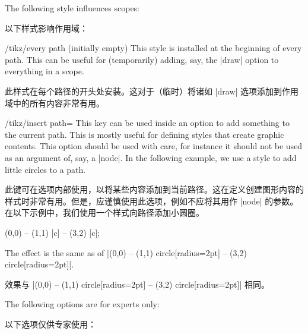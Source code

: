 The following style influences scopes:


以下样式影响作用域：

%
\begin{stylekey}{/tikz/every path (initially \normalfont empty)}
    This style is installed at the beginning of every path. This can be
    useful for (temporarily) adding, say, the |draw| option to everything
    in a scope.
    
    此样式在每个路径的开头处安装。这对于（临时）将诸如 |draw| 选项添加到作用域中的所有内容非常有用。%
\begin{codeexample}[]
\end{codeexample}
\end{stylekey}

\begin{key}{/tikz/insert path=}
    This key can be used inside an option to add something to the current path.
    This is mostly useful for defining styles that create graphic contents.
    This option should be used with care, for instance it should not be used as
    an argument of, say, a |node|. In the following example, we use a style to
    add little circles to a path.

    此键可在选项内部使用，以将某些内容添加到当前路径。这在定义创建图形内容的样式时非常有用。但是，应谨慎使用此选项，例如不应将其用作 |node| 的参数。在以下示例中，我们使用一个样式向路径添加小圆圈。
\begin{codeexample}[]
\tikz [c/.style={insert path={circle[radius=2pt]}}]
  \draw (0,0) -- (1,1) [c] -- (3,2) [c];
\end{codeexample}
     The effect is the same as of
    |(0,0) -- (1,1) circle[radius=2pt] -- (3,2) circle[radius=2pt]|.

    效果与 |(0,0) -- (1,1) circle[radius=2pt] -- (3,2) circle[radius=2pt]| 相同。
\end{key}

The following options are for experts only:

以下选项仅供专家使用：



